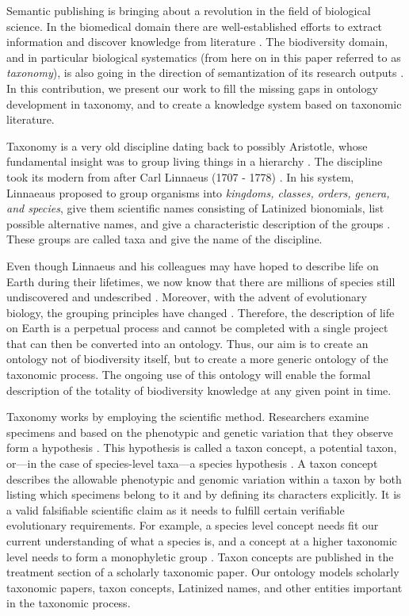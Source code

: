 \documentclass{IOS-Book-Article}
\begin{document}
Semantic publishing is bringing about a revolution in the field of biological science. In the biomedical domain there are well-established efforts to extract information and discover knowledge from literature \cite{r1, r2, r3}. The biodiversity domain, and in particular biological systematics (from here on in this paper referred to as \emph{taxonomy}), is also going in the direction of semantization of its research outputs \cite{r4,r5,r6}. In this contribution, we present our work to fill the missing gaps in ontology development in taxonomy, and to create a knowledge system based on taxonomic literature.

Taxonomy is a very old discipline dating back to possibly Aristotle, whose fundamental insight was to group living things in a hierarchy \cite{r7}. The discipline took its modern from after Carl Linnaeus (1707 - 1778) \cite{r7}. In his system, Linnaeaus proposed to group organisms into \emph{kingdoms, classes, orders, genera, and species}, give them scientific names consisting of Latinized bionomials, list possible alternative names, and give a characteristic description of the groups \cite{r8}. These groups are called taxa and give the name of the discipline.

Even though Linnaeus and his colleagues may have hoped to describe life on Earth during their lifetimes, we now know that there are millions of species still undiscovered and undescribed \cite{r9}. Moreover, with the advent of evolutionary biology, the grouping principles have changed \cite{r10}. Therefore, the description of life on Earth is a perpetual process and cannot be completed with a single project that can then be converted into an ontology. Thus, our aim is to create an ontology not of biodiversity itself, but to create a more generic ontology of the taxonomic process. The ongoing use of this ontology will enable the formal description of the totality of biodiversity knowledge at any given point in time.

Taxonomy works by employing the scientific method. Researchers examine specimens and based on the phenotypic and genetic variation that they observe form a hypothesis \cite{r11}. This hypothesis is called a taxon concept, a potential taxon, or---in the case of species-level taxa---a species hypothesis \cite{r12}. A taxon concept describes the allowable phenotypic and genomic variation within a taxon by both listing which specimens belong to it and by defining its characters explicitly. It is a valid falsifiable scientific claim as it needs to fulfill certain verifiable evolutionary requirements. For example, a species level concept needs fit our current understanding of what a species is, and a concept at a higher taxonomic level needs to form a monophyletic group \cite{r10}. Taxon concepts are published in the treatment section \cite{r13} of a scholarly taxonomic paper. Our ontology models scholarly taxonomic papers, taxon concepts, Latinized names, and other entities important in the taxonomic process.
\end{document}
